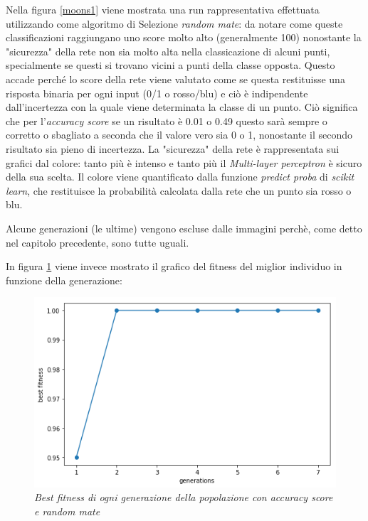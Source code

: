\documentclass[12pt,a4paper]{report}
\begin{document}
Nella figura \ref{moons1} viene mostrata una run rappresentativa effettuata utilizzando come algoritmo di Selezione \textit{random mate}: da notare come queste classificazioni raggiungano uno score molto alto (generalmente 100\textdiscount) nonostante la "sicurezza" della rete non sia molto alta nella classicazione di alcuni punti, specialmente se questi si trovano vicini a punti della classe opposta.
Questo accade perché lo score della rete viene valutato come se questa restituisse una risposta binaria per ogni input (0/1 o rosso/blu) e ciò è indipendente dall'incertezza con la quale viene determinata la classe di un punto. 
Ciò significa che per l'\textit{accuracy score} se un risultato è 0.01 o 0.49 questo sarà sempre o corretto o sbagliato a seconda che il valore vero sia 0 o 1, nonostante il secondo risultato sia pieno di incertezza.  
La "sicurezza" della rete è rappresentata sui grafici dal colore: tanto più è intenso e tanto  più il \textit{Multi-layer perceptron} è sicuro della sua scelta.
Il colore viene quantificato dalla funzione \textit{predict proba} di \textit{scikit learn}, che restituisce la probabilità calcolata dalla rete che un punto sia rosso o blu.

Alcune generazioni (le ultime) vengono escluse dalle immagini perchè, come detto nel capitolo precedente, sono tutte uguali.

In figura \ref{best1} viene invece mostrato il grafico del fitness del miglior individuo in funzione della generazione:

\begin{figure}[H]
 \centering
 \includegraphics[scale = 0.4]{images/moons-rnd-acc./best}
 \caption{\textit{Best fitness di ogni generazione della popolazione con accuracy score e random mate}}
 \label{best1}
\end{figure}
\end{document}
